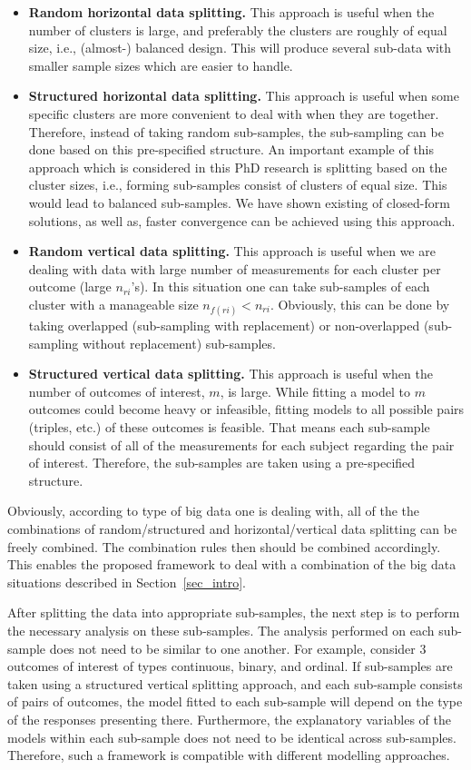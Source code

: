 \documentclass[14pt]{article}
\begin{document}
\begin{itemize}
\item \textbf{Random horizontal data splitting.} This approach is useful when the number of clusters is large, and preferably the clusters are roughly of equal size, i.e., (almost-) balanced design. This will produce several sub-data with smaller sample sizes which are easier to handle.
\item \textbf{Structured horizontal data splitting.} This approach is useful when some specific clusters are more convenient to deal with when they are together. Therefore, instead of taking random sub-samples, the sub-sampling can be done based on this pre-specified structure. An important example of this approach which is considered in this PhD research is splitting based on the cluster sizes, i.e., forming sub-samples consist of clusters of equal size. This would lead to balanced sub-samples. We have shown existing of closed-form solutions, as well as, faster convergence can be achieved using this approach.
\item \textbf{Random vertical data splitting.} This approach is useful when we are dealing with data with large number of measurements for each cluster per outcome (large $n_{ri}$'s). In this situation one can take sub-samples of each cluster with a manageable size $n_{f(ri)} < n_{ri}$. Obviously, this can be done by taking overlapped (sub-sampling with replacement) or non-overlapped (sub-sampling without replacement) sub-samples.
\item \textbf{Structured vertical data splitting.} This approach is useful when the number of outcomes of interest, $m$, is large. While fitting a model to $m$ outcomes could become heavy or infeasible, fitting models to all possible pairs (triples, etc.) of these outcomes is feasible. That means each sub-sample should consist of all of the measurements for each subject regarding the pair of interest. Therefore, the sub-samples are taken using a pre-specified structure.
\end{itemize}
Obviously, according to type of big data one is dealing with, all of the the combinations of random/structured and horizontal/vertical data splitting can be freely combined. The combination rules then should be combined accordingly. This enables the proposed framework to deal with a combination of the big data situations described in Section~\ref{sec_intro}.


After splitting the data into appropriate sub-samples, the next step is to perform the necessary analysis on these sub-samples. The analysis performed on each sub-sample does not need to be similar to one another. For example, consider 3 outcomes of interest of types continuous, binary, and ordinal. If sub-samples are taken using a structured vertical splitting approach, and each sub-sample consists of pairs of outcomes, the model fitted to each sub-sample will depend on the type of the responses presenting there. Furthermore, the explanatory variables of the models within each sub-sample does not need to be identical across sub-samples. Therefore, such a framework is compatible with different modelling approaches.
\end{document}
